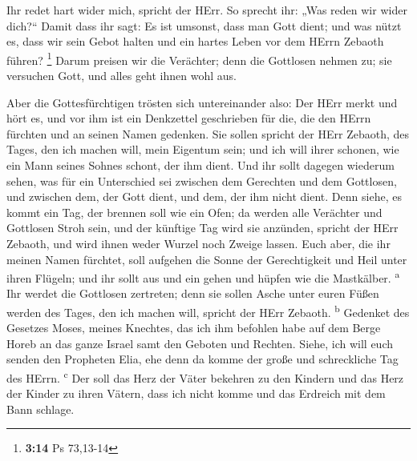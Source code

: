  Ihr redet hart wider mich, spricht der HErr. So sprecht
ihr: „Was reden wir wider dich?{}``  Damit dass ihr sagt:
Es ist umsonst, dass man Gott dient; und was nützt es, dass wir sein
Gebot halten und ein hartes Leben vor dem HErrn Zebaoth führen?
\footnote{\textbf{3:14} Ps 73,13-14}  Darum preisen wir
die Verächter; denn die Gottlosen nehmen zu; sie versuchen Gott, und
alles geht ihnen wohl aus.

 Aber die Gottesfürchtigen trösten sich untereinander
also: Der HErr merkt und hört es, und vor ihm ist ein Denkzettel
geschrieben für die, die den HErrn fürchten und an seinen Namen
gedenken.  Sie sollen spricht der HErr Zebaoth, des
Tages, den ich machen will, mein Eigentum sein; und ich will ihrer
schonen, wie ein Mann seines Sohnes schont, der ihm dient.
 Und ihr sollt dagegen wiederum sehen, was für ein
Unterschied sei zwischen dem Gerechten und dem Gottlosen, und zwischen
dem, der Gott dient, und dem, der ihm nicht dient.  Denn
siehe, es kommt ein Tag, der brennen soll wie ein Ofen; da werden alle
Verächter und Gottlosen Stroh sein, und der künftige Tag wird sie
anzünden, spricht der HErr Zebaoth, und wird ihnen weder Wurzel noch
Zweige lassen.  Euch aber, die ihr meinen Namen fürchtet,
soll aufgehen die Sonne der Gerechtigkeit und Heil unter ihren Flügeln;
und ihr sollt aus und ein gehen und hüpfen wie die Mastkälber.
\textsuperscript{a}  Ihr werdet die Gottlosen zertreten;
denn sie sollen Asche unter euren Füßen werden des Tages, den ich machen
will, spricht der HErr Zebaoth. \textsuperscript{b} 
Gedenket des Gesetzes Moses, meines Knechtes, das ich ihm befohlen habe
auf dem Berge Horeb an das ganze Israel samt den Geboten und Rechten.
 Siehe, ich will euch senden den Propheten Elia, ehe denn
da komme der große und schreckliche Tag des HErrn. \textsuperscript{c}
 Der soll das Herz der Väter bekehren zu den Kindern und
das Herz der Kinder zu ihren Vätern, dass ich nicht komme und das
Erdreich mit dem Bann schlage.

